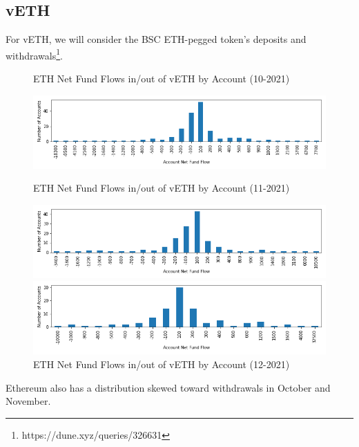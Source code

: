 \documentclass[12pt]{article}
\begin{document}
        \subsection*{vETH}
            For vETH, we will consider the BSC ETH-pegged token's deposits and withdrawals\footnote{https://dune.xyz/queries/326631}.
            \begin{figure}[h]
                \caption{ETH Net Fund Flows in/out of vETH by Account (10-2021) \label{overflow}}
                \centering
                \hspace*{-1in}
                \includegraphics[width=0.8\paperwidth]{net-fundflow-accountdist-vETH-10-2021.png}

                \caption{ETH Net Fund Flows in/out of vETH by Account (11-2021) \label{overflow}}
                \centering
                \hspace*{-1in}
                \includegraphics[width=0.8\paperwidth]{net-fundflow-accountdist-vETH-11-2021.png}

                \caption{ETH Net Fund Flows in/out of vETH by Account (12-2021) \label{overflow}}
                \centering
                \hspace*{-1in}
                \includegraphics[width=0.8\paperwidth]{net-fundflow-accountdist-vETH-12-2021.png}
            \end{figure}

            Ethereum also has a distribution skewed toward withdrawals in October and November.
            \clearpage
        
\end{document}
